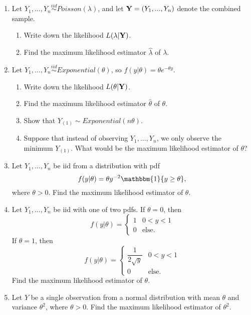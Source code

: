 \documentclass[11pt]{article}
\begin{document}
\begin{enumerate}
\item Let $Y_1,...,Y_n \overset{iid}{\sim} Poisson(\lambda)$, and let ${\bf Y} = (Y_1,...,Y_n)$ denote the combined sample.

\begin{enumerate}
\item Write down the likelihood $L(\lambda |{\bf Y} )$.

\item Find the maximum likelihood estimator $\widehat{\lambda}$ of $\lambda$.
\end{enumerate}

\item Let $Y_1,...,Y_n \overset{iid}{\sim} Exponential(\theta)$, so $f(y | \theta) = \theta e^{-\theta y}$.

\begin{enumerate}
\item Write down the likelihood $L(\theta | {\bf Y})$.

\item Find the maximum likelihood estimator $\widehat{\theta}$ of $\theta$.

\item Show that $Y_{(1)} \sim Exponential(n \theta)$.

\item Suppose that instead of observing $Y_1,...,Y_n$, we only observe the minimum $Y_{(1)}$. What would be the maximum likelihood estimator of $\theta$?
\end{enumerate}

\item Let $Y_1,...,Y_n$ be iid from a distribution with pdf
$$f(y|\theta) = \theta y^{-2} \mathbbm{1}\{y \geq \theta \},$$
where $\theta > 0$. Find the maximum likelihood estimator of $\theta$.

\item Let $Y_1,...,Y_n$ be iid with one of two pdfs. If $\theta = 0$, then
$$f(y | \theta) = \begin{cases}
1 & 0 < y < 1 \\
0 & \text{else}.
\end{cases}$$
If $\theta = 1$, then
$$f(y | \theta) = \begin{cases}
\dfrac{1}{2 \sqrt{y}} & 0 < y < 1 \\
0 & \text{else}.
\end{cases}$$
Find the maximum likelihood estimator of $\theta$.

\item Let $Y$ be a single observation from a normal distribution with mean $\theta$ and variance $\theta^2$, where $\theta > 0$. Find the maximum likelihood estimator of $\theta^2$.


\end{enumerate}
\end{document}
